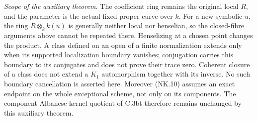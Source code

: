 \emph{Scope of the auxiliary theorem.}
The coefficient ring remains the original local $R$, and the
parameter is the actual fixed proper curve over $k$.
For a new symbolic $u$, the ring $R\otimes_k k(u)$ is generally
neither local nor henselian, so the closed-fibre arguments above
cannot be repeated there.  Henselizing at a chosen point changes
the product.  A class defined on an open of a finite normalization
extends only when its supported localization boundary vanishes;
conjugation carries this boundary to its conjugates and does not
prove their trace zero.  Coherent closure of a class does not
extend a $K_1$ automorphism together with its inverse.  No such
boundary cancellation is asserted here.  Moreover (NK.10) assumes
an exact endpoint on the whole exceptional scheme, not only on
its components.  The component Albanese-kernel quotient of C.3bt
therefore remains unchanged by this auxiliary theorem.
